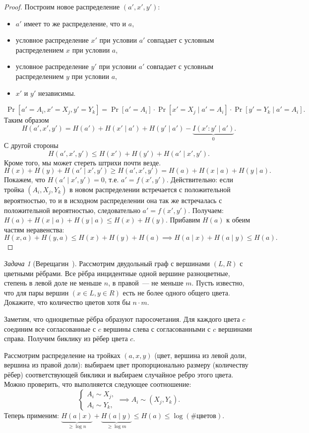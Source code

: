 \documentclass[12pt]{article}
\theoremstyle{definition}
\theoremstyle{plain}
\theoremstyle{remark}
\newtheorem{problem}{Задача}[section]
\begin{document}
\begin{proof}
    Построим новое распределение $(a',x',y')$:
    \begin{itemize}
        \item $a'$ имеет то же распределение, что и $a$,
        \item условное распределение $x'$ при условии $a'$ совпадает
            с условным распределением $x$ при условии $a$,
        \item условное распределение $y'$ при условии $a'$ совпадает
            с условным распределением $y$ при условии $a$,
        \item $x'$ и $y'$ независимы.
    \end{itemize}
    \[\
    \Pr[a'=A_i, x' = X_j, y' = Y_k] = 
    \Pr[a'=A_i]\cdot \Pr[x' = X_j\mid a'=A_i]\cdot \Pr[y' = Y_k\mid a' = A_i].
    \]
    Таким образом
    \[
        H(a',x',y') = H(a') + H(x'\mid a') + H(y'\mid a') - \underbrace{I(x':y'\mid a')}_{0}.
    \]
    С другой стороны
    \[
        H(a',x',y') \le H(x') + H(y') + H(a'\mid x',y').
    \]
    Кроме того, мы может стереть штрихи почти везде.
    \[
        H(x) + H(y) + H(a'\mid x',y') \ge H(a',x',y') = H(a) + H(x\mid a) + H(y\mid a).
    \]
    Покажем, что $H(a'\mid x', y') = 0$, т.е. $a' = f(x',y')$. Действительно: 
    если тройка $(A_i, X_j, Y_k)$ в новом распределении встречается с положительной
    вероятностью, то и в исходном распределении она так же встречалась с положительной
    вероятностью, следовательно $a' = f(x',y')$.
    Получаем: $H(a) + H(x\mid a) + H(y\mid a) \le H(x) + H(y)$. Прибавим $H(a)$ к обеим частям
    неравенства:
    \[
       H(x,a) + H(y,a) \le H(x) + H(y) + H(a)\implies H(a\mid x) + H(a \mid y) \le H(a).
    \]
\end{proof}
\begin{problem}[Верещагин~\cite{KRV18}]
    Рассмотрим двудольный граф с вершинами $(L,R)$ с цветными рёбрами.
    Все рёбра инцидентные одной вершине разноцветные, степень в левой доле не меньше $n$, 
    в правой~--- не меньше $m$. Пусть известно, что для пары вершин $(x\in L, y\in R)$
    есть не более одного общего цвета. Докажите, что количество цветов хотя бы $n\cdot m$.

    Заметим, что одноцветные рёбра образуют паросочетания. Для каждого цвета $c$ соединим все
    согласованные с $c$ вершины слева с согласованными с $c$ вершинами справа. Получим биклику из
    рёбер цвета $c$.

    Рассмотрим распределение на тройках $(a,x,y)$ (цвет, вершина из левой доли, вершина из правой
    доли): выбираем цвет пропорционально размеру (количеству рёбер) соответствующей биклики и 
    выбираем случайное ребро этого цвета. Можно проверить, что выполняется следующее соотношение:
\[
    \begin{cases}
        A_i \sim X_j,\\
        A_i \sim Y_k,
    \end{cases} \implies A_i\sim(X_j,Y_k).
\]
Теперь применим: $\underbrace{H(a\mid x)}_{\ge\log n} + 
                  \underbrace{H(a\mid y)}_{\ge\log m} \le H(a) \le \log (\text{\# цветов})$.
\end{problem}
\end{document}
